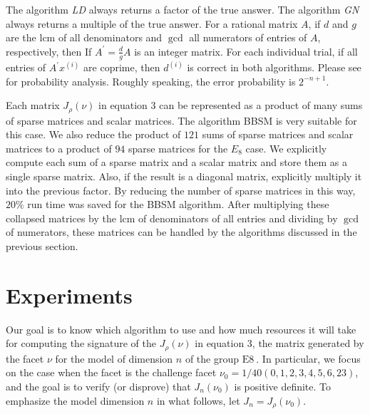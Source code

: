 \documentclass{acm_proc_article-sp}
\newcommand{\EE}{\ensuremath{{\mbox{E}8}~}}
\newcommand{\M}[2]{\ensuremath{J_{#2}({#1})}}
\newcommand{\lcm}{\ensuremath{\mbox{lcm}}}
\begin{document}
The algorithm {\em LD}
always returns a factor of the true answer.
The algorithm {\em GN}
always returns a multiple of the true answer.
For a rational matrix $A$, if 
$d$ and $g$ are the $\lcm$ of all denominators 
and $\gcd$ all numerators of entries of $A$, respectively,
then If $A^\prime = \frac{d}{g}A$ is an integer matrix.
For each individual trial,
if all entries of  $A^\prime x^{(i)}$ are coprime,
then $d^{(i)}$ is correct in both algorithms.
Please see \cite{Saunders::LA::2004} for probability analysis. 
Roughly speaking, the error probability is $2^{-n + 1}$.

Each matrix $J_\rho(\nu)$ in equation 3 can be represented as
a product of many sums of sparse matrices and scalar matrices.
The algorithm BBSM is very suitable for this case.
We also reduce the product of $121$ sums of sparse matrices and scalar matrices
to a product of $94$ sparse matrices for the $E_8$ case. 
We explicitly compute each sum of a sparse matrix and a scalar matrix and 
store them as a single sparse matrix.  Also, if the result is a diagonal matrix,
explicitly multiply it into the previous factor.
By reducing the number of sparse matrices in this way, 
$20\%$ run time was saved for the BBSM algorithm. 
After multiplying these collapsed matrices 
by the $\lcm$ of denominators of all entries and dividing
by $\gcd$ of numerators, these matrices can be handled by the
algorithms discussed in the previous section.

\section{Experiments} %
Our goal is to know which algorithm to use and how much resources it will take 
for computing the signature of %
the $\M{\nu}{\rho}$ in equation 3,
the matrix generated by the facet $\nu$
for the model of dimension $n$ of the group \EE.  
In particular, we focus on the case when
the facet is the challenge facet $\nu_0 = 1/40 (0,1,2,3,4,5,6,23)$, 
and the goal is to verify (or disprove) that $\M{\nu_0}{n}$ is positive definite.  
To emphasize the model dimension $n$ in what follows, let $J_n = \M{\nu_0}{\rho}$.
\end{document}
